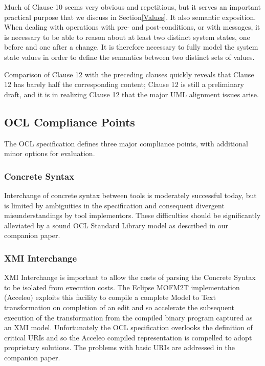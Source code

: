 \documentclass{eceasst}
\begin{document}
Much of Clause 10 seems very obvious and repetitious, but it serves an important practical purpose that we discuss in Section\ref{Values}. It also semantic exposition. When dealing with operations with pre- and post-conditions, or with messages, it is necessary to be able to reason about at least two distinct system states, one before and one after a change. It is therefore necessary to fully model the system state values in order to define the semantics between two distinct sets of values.

Comparison of Clause 12 with the preceding clauses quickly reveals that Clause 12 has barely half the corresponding content; Clause 12 is still a preliminary draft, and it is in realizing Clause 12 that the major UML alignment issues arise.
 
\subsection{OCL Compliance Points}

The OCL specification defines three major compliance points, with additional minor options for evaluation.

\subsubsection{Concrete Syntax}

Interchange of concrete syntax between tools is moderately successful today, but is limited by ambiguities in the specification and consequent divergent misunderstandings by tool implementors. These difficulties should be significantly alleviated by a sound OCL Standard Library model as described in our companion paper\cite{OCL-stdlib}.
 
\subsubsection{XMI Interchange}

XMI Interchange is important to allow the costs of parsing the Concrete Syntax to be isolated from execution costs. The Eclipse MOFM2T implementation (Acceleo) exploits this facility to compile a complete Model to Text transformation on completion of an edit and so accelerate the subsequent execution of the transformation from the compiled binary program captured as an XMI model. Unfortunately the OCL specification overlooks the definition of critical URIs and so the Acceleo compiled representation is compelled to adopt proprietary solutions. The problems with basic URIs are addressed in the companion paper.
\end{document}
